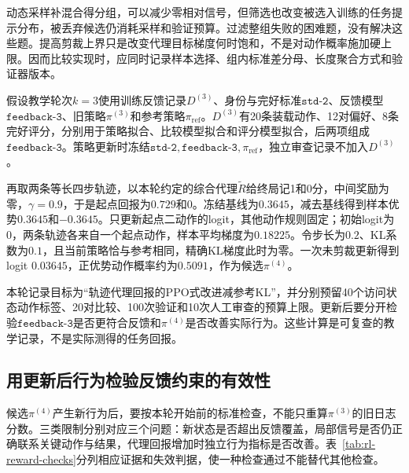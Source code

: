 动态采样补混合得分组，可以减少零相对信号，但筛选也改变被选入训练的任务提示分布，被丢弃候选仍消耗采样和验证预算。过滤整组失败的困难题，没有解决这些题。提高剪裁上界只是改变代理目标梯度何时饱和，不是对动作概率施加硬上限。因而比较实现时，应同时记录样本选择、组内标准差分母、长度聚合方式和验证器版本。

\begin{example}[一轮可复查的更新记录]
  \label{ex:rl-reward-round}
  假设教学轮次$k=3$使用训练反馈记录$D^{(3)}$、身份与完好标准$\texttt{std-2}$、反馈模型$\texttt{feedback-3}$、旧策略$\pi^{(3)}$和参考策略$\pi_{\mathrm{ref}}$。$D^{(3)}$有20条装载动作、12对偏好、8条完好评分，分别用于策略拟合、比较模型拟合和评分模型拟合，后两项组成$\texttt{feedback-3}$。策略更新时冻结$\texttt{std-2},\texttt{feedback-3},\pi_{\mathrm{ref}}$，独立审查记录不加入$D^{(3)}$。

  再取两条等长四步轨迹，以本轮约定的综合代理$\widetilde R$给终局记1和0分，中间奖励为零，$\gamma=0.9$，于是起点回报为$0.729$和0。冻结基线为$0.3645$，减去基线得到样本优势$0.3645$和$-0.3645$。只更新起点二动作的logit，其他动作规则固定；初始logit为0，两条轨迹各来自一个起点动作，样本平均梯度为$0.18225$。令步长为$0.2$、KL系数为$0.1$，且当前策略恰与参考相同，精确KL梯度此时为零。一次未剪裁更新得到logit $0.03645$，正优势动作概率约为$0.5091$，作为候选$\pi^{(4)}$。

  本轮记录目标为“轨迹代理回报的PPO式改进减参考KL”，并分别预留40个访问状态动作标签、20对比较、100次验证和10次人工审查的预算上限。更新后要分开检验$\texttt{feedback-3}$是否更符合反馈和$\pi^{(4)}$是否改善实际行为。这些计算是可复查的教学记录，不是实际测得的任务回报。
\end{example}

\subsection{用更新后行为检验反馈约束的有效性}
\label{sec:rl-reward-loop-check}

候选$\pi^{(4)}$产生新行为后，要按本轮开始前的标准检查，不能只重算$\pi^{(3)}$的旧日志分数。三类限制分别对应三个问题：新状态是否超出反馈覆盖，局部信号是否仍正确联系关键动作与结果，代理回报增加时独立行为指标是否改善。表~\ref{tab:rl-reward-checks}分列相应证据和失效判据，使一种检查通过不能替代其他检查。

